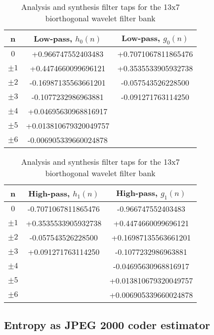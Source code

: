 \begin{table}[!htb]
    \centering
    \caption{Analysis and synthesis filter taps for the 13x7 biorthogonal wavelet filter bank}
    \label{tab:anal_synth_137}
\begin{tabular}{ccc}
    \toprule
    n         & Low-pass, $h_{0}(n)$ & Low-pass, $g_{0}(n)$ \\
    \midrule
    $0$       & +0.966747552403483     & +0.7071067811865476  \\
    $\pm 1$   & +0.4474660099696121    & +0.3535533905932738  \\
    $\pm 2$   & -0.16987135563661201   & -0.057543526228500  \\
    $\pm 3$   & -0.1077232986963881    & -0.091271763114250  \\
    $\pm 4$   & +0.04695630968816917   &                     \\
    $\pm 5$   & +0.013810679320049757  &                     \\
    $\pm 6$   & -0.006905339660024878  &                     \\
    \bottomrule
\end{tabular}

\bigskip
\bigskip


\begin{tabular}{ccc}
    \toprule
    n         & High-pass, $h_{1}(n)$ & High-pass, $g_{1}(n)$ \\
    \midrule
    $0$       & -0.7071067811865476    & -0.966747552403483  \\
    $\pm 1$   & +0.3535533905932738    & +0.4474660099696121  \\
    $\pm 2$   & -0.057543526228500     & +0.16987135563661201  \\
    $\pm 3$   & +0.091271763114250     & -0.1077232986963881  \\
    $\pm 4$   &                        & -0.04695630968816917 \\
    $\pm 5$   &                        & +0.013810679320049757 \\
    $\pm 6$   &                        & +0.006905339660024878 \\
    \bottomrule
\end{tabular}
\end{table}

\subsection{Entropy as JPEG 2000 coder estimator}

